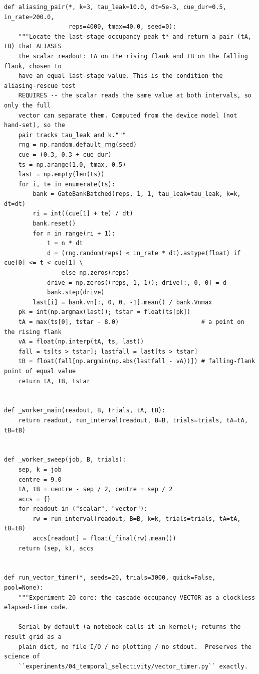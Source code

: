 \begin{lstlisting}[caption={mrl\_trace/selectivity.py},label={lst:siox-src-selectivity}]
def aliasing_pair(*, k=3, tau_leak=10.0, dt=5e-3, cue_dur=0.5, in_rate=200.0,
                  reps=4000, tmax=40.0, seed=0):
    """Locate the last-stage occupancy peak t* and return a pair (tA, tB) that ALIASES
    the scalar readout: tA on the rising flank and tB on the falling flank, chosen to
    have an equal last-stage value. This is the condition the aliasing-rescue test
    REQUIRES -- the scalar reads the same value at both intervals, so only the full
    vector can separate them. Computed from the device model (not hand-set), so the
    pair tracks tau_leak and k."""
    rng = np.random.default_rng(seed)
    cue = (0.3, 0.3 + cue_dur)
    ts = np.arange(1.0, tmax, 0.5)
    last = np.empty(len(ts))
    for i, te in enumerate(ts):
        bank = GateBankBatched(reps, 1, 1, tau_leak=tau_leak, k=k, dt=dt)
        ri = int((cue[1] + te) / dt)
        bank.reset()
        for n in range(ri + 1):
            t = n * dt
            d = (rng.random(reps) < in_rate * dt).astype(float) if cue[0] <= t < cue[1] \
                else np.zeros(reps)
            drive = np.zeros((reps, 1, 1)); drive[:, 0, 0] = d
            bank.step(drive)
        last[i] = bank.vn[:, 0, 0, -1].mean() / bank.Vnmax
    pk = int(np.argmax(last)); tstar = float(ts[pk])
    tA = max(ts[0], tstar - 8.0)                       # a point on the rising flank
    vA = float(np.interp(tA, ts, last))
    fall = ts[ts > tstar]; lastfall = last[ts > tstar]
    tB = float(fall[np.argmin(np.abs(lastfall - vA))]) # falling-flank point of equal value
    return tA, tB, tstar


def _worker_main(readout, B, trials, tA, tB):
    return readout, run_interval(readout, B=B, trials=trials, tA=tA, tB=tB)


def _worker_sweep(job, B, trials):
    sep, k = job
    centre = 9.0
    tA, tB = centre - sep / 2, centre + sep / 2
    accs = {}
    for readout in ("scalar", "vector"):
        rw = run_interval(readout, B=B, k=k, trials=trials, tA=tA, tB=tB)
        accs[readout] = float(_final(rw).mean())
    return (sep, k), accs


def run_vector_timer(*, seeds=20, trials=3000, quick=False, pool=None):
    """Experiment 20 core: the cascade occupancy VECTOR as a clockless elapsed-time code.

    Serial by default (a notebook calls it in-kernel); returns the result grid as a
    plain dict, no file I/O / no plotting / no stdout.  Preserves the science of
    ``experiments/04_temporal_selectivity/vector_timer.py`` exactly.


\end{lstlisting}
